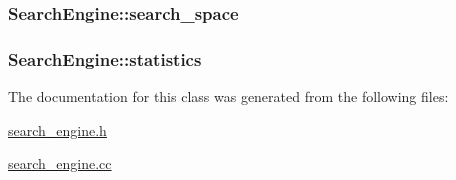 \hypertarget{classSearchEngine_a25da0eadad8b694e645738f096c1afc4}{
\subsubsection[{search\-\_\-space}]{ Search\-Engine\-::search\-\_\-space\hspace{0.3cm}{\ttfamily [protected]}}}\label{classSearchEngine_a25da0eadad8b694e645738f096c1afc4}
\hypertarget{classSearchEngine_a904954dd91947b71a737215b8b5ea9e8}{
\subsubsection[{statistics}]{ Search\-Engine\-::statistics\hspace{0.3cm}{\ttfamily [protected]}}}\label{classSearchEngine_a904954dd91947b71a737215b8b5ea9e8}


The documentation for this class was generated from the following files\-:\begin{DoxyCompactItemize}
\item 
\hyperlink{search__engine_8h}{search\-\_\-engine.\-h}\item 
\hyperlink{search__engine_8cc}{search\-\_\-engine.\-cc}\end{DoxyCompactItemize}
